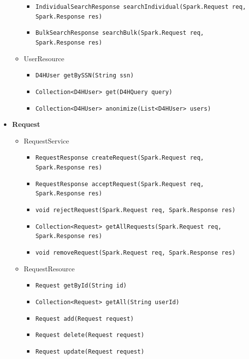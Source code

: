 \documentclass[a4paper, hidelinks, 12pt]{report}
\begin{document}
\begin{itemize}
\begin{itemize}
\begin{itemize}
						\item{\verb|IndividualSearchResponse searchIndividual(Spark.Request req,|\\ \verb|Spark.Response res)|}
						\item{\verb|BulkSearchResponse searchBulk(Spark.Request req, Spark.Response res)|}
					\end{itemize}
				\item{UserResource}
					\begin{itemize}
						\item{\verb|D4HUser getBySSN(String ssn)|}
						\item{\verb|Collection<D4HUser> get(D4HQuery query)|}
						\item{\verb|Collection<D4HUser> anonimize(List<D4HUser> users)|}
					\end{itemize}
			\end{itemize}
			\item{\textbf{Request}}
			\begin{itemize}
				\item{RequestService}
					\begin{itemize}
						\item{\verb|RequestResponse createRequest(Spark.Request req, Spark.Response res)|}
						\item{\verb|RequestResponse acceptRequest(Spark.Request req, Spark.Response res)|}
						\item{\verb|void rejectRequest(Spark.Request req, Spark.Response res)|}
						\item{\verb|Collection<Request> getAllRequests(Spark.Request req,|\\ \verb|Spark.Response res)|}
						\item{\verb|void removeRequest(Spark.Request req, Spark.Response res)|}
					\end{itemize}
				\item{RequestResource}
					\begin{itemize}
						\item{\verb|Request getById(String id)|}
						\item{\verb|Collection<Request> getAll(String userId)|}
						\item{\verb|Request add(Request request)|}
						\item{\verb|Request delete(Request request)|}
						\item{\verb|Request update(Request request)|}
					\end{itemize}
			\end{itemize}

\end{itemize}
\end{document}
